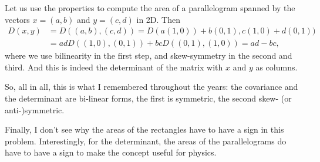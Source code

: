 \begin{exercise}
\begin{solution}
Let us use the properties to compute the area of a parallelogram spanned by the vectors $x = (a,b)$ and $y =(c,d)$ in 2D. Then
\begin{align*}
D(x,y) &= D((a,b), (c,d)) =  D(a (1,0)) + b(0,1), c(1,0) + d(0,1)) \\
&= ad D((1,0), (0,1)) + b c D((0,1), (1,0)) = ad - b c,
\end{align*}
where we use bilinearity in the first step, and skew-symmetry in the second and third. And this is indeed the determinant of the matrix with $x$ and $y$ as columns.

So, all in all, this is what I remembered throughout the years: the covariance and the determinant are bi-linear forms, the first is symmetric, the second skew- (or anti-)symmetric.

Finally, I don't see why the areas of the rectangles have to have a sign in this problem. Interestingly, for the determinant, the areas of the parallelograms do have to have a sign to make the concept useful for physics.
\end{solution}
\end{exercise}

